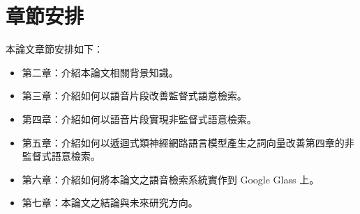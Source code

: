 \section{章節安排}
本論文章節安排如下：
\begin{itemize}
\itemsep -2pt %
    \item  第二章：介紹本論文相關背景知識。
    \item  第三章：介紹如何以語音片段改善監督式語意檢索。
    \item  第四章：介紹如何以語音片段實現非監督式語意檢索。
    \item  第五章：介紹如何以遞迴式類神經網路語言模型產生之詞向量改善第四章的非監督式語意檢索。
    \item  第六章：介紹如何將本論文之語音檢索系統實作到 Google Glass 上。
    \item  第七章：本論文之結論與未來研究方向。
\end{itemize}

